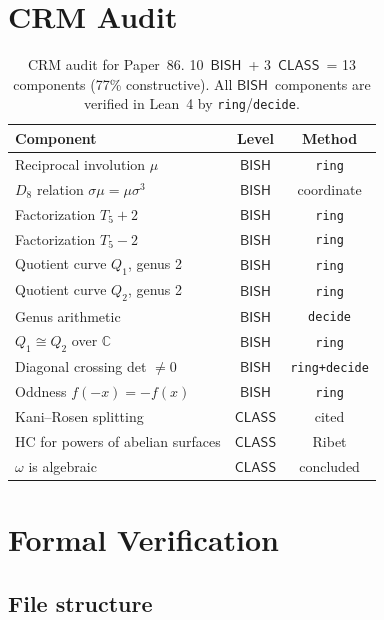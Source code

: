 \documentclass[11pt]{article}
\theoremstyle{plain}
\theoremstyle{definition}
\theoremstyle{remark}
\newcommand{\C}{\mathbb{C}}
\newcommand{\BISH}{\ensuremath{\mathsf{BISH}}}
\newcommand{\CLASS}{\ensuremath{\mathsf{CLASS}}}
\begin{document}
\section{CRM Audit}
\label{sec:audit}

\begin{table}[h]
\centering
\small
\begin{tabular}{>{\raggedright}p{5cm} c c}
\toprule
\textbf{Component} & \textbf{Level} & \textbf{Method} \\
\midrule
Reciprocal involution $\mu$ & \BISH & \texttt{ring} \\
$D_8$ relation $\sigma\mu = \mu\sigma^3$ & \BISH & coordinate \\
Factorization $T_5 + 2$ & \BISH & \texttt{ring} \\
Factorization $T_5 - 2$ & \BISH & \texttt{ring} \\
Quotient curve $Q_1$, genus 2 & \BISH & \texttt{ring} \\
Quotient curve $Q_2$, genus 2 & \BISH & \texttt{ring} \\
Genus arithmetic & \BISH & \texttt{decide} \\
$Q_1 \cong Q_2$ over $\C$ & \BISH & \texttt{ring} \\
Diagonal crossing det $\neq 0$ & \BISH & \texttt{ring+decide} \\
Oddness $f(-x) = -f(x)$ & \BISH & \texttt{ring} \\
\midrule
Kani--Rosen splitting & \CLASS & cited \\
HC for powers of abelian surfaces & \CLASS & Ribet \\
$\omega$ is algebraic & \CLASS & concluded \\
\bottomrule
\end{tabular}
\caption{CRM audit for Paper~86.  10~\BISH\ + 3~\CLASS\ = 13 components
(77\% constructive).  All \BISH\ components are verified
in Lean~4 by \texttt{ring}/\texttt{decide}.}
\label{tab:audit}
\end{table}

\section{Formal Verification}
\label{sec:lean}

\subsection{File structure}
\end{document}
